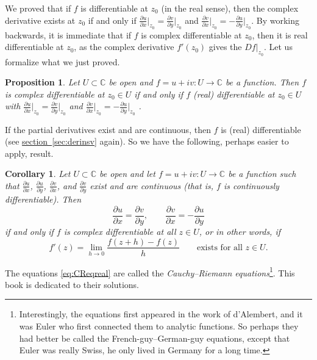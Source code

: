 \documentclass[12pt,openany]{book}
\newcommand{\C}{{\mathbb{C}}}
\newcommand{\myindex}[1]{#1\index{#1}}
\theoremstyle{plain}
\newtheorem{prop}[thm]{Proposition}
\newtheorem{cor}[thm]{Corollary}
\theoremstyle{remark}
\theoremstyle{definition}
\theoremstyle{exercise}
\theoremstyle{example}
\newcommand{\sectionref}[1]{\hyperref[#1]{section~\ref*{#1}}}
\begin{document}
We proved that if $f$ is differentiable at $z_0$ (in the real sense), then 
the complex derivative exists at $z_0$ if and only if 
$\frac{\partial u}{\partial x}\big|_{z_0} = \frac{\partial v}{\partial
y}\big|_{z_0}$ and $\frac{\partial v}{\partial x}\big|_{z_0} = -\frac{\partial
u}{\partial y}\big|_{z_0}$.
By working backwards, it is immediate
that if $f$ is complex differentiable at $z_0$, then it is real
differentiable at $z_0$,
as the complex derivative $f'(z_0)$ gives the $Df|_{z_0}$.  Let us formalize
what we just proved.

\begin{prop}
Let $U \subset \C$ be open and $f = u+iv \colon U \to \C$ be a function.
Then
$f$ is complex differentiable at $z_0 \in U$
if and only if
$f$ (real) differentiable at $z_0 \in U$
with
$\frac{\partial u}{\partial x}\big|_{z_0} =
\frac{\partial v}{\partial y}\big|_{z_0}$
and
$\frac{\partial v}{\partial x}\big|_{z_0} =
-\frac{\partial u}{\partial y}\big|_{z_0}$ .
\end{prop}

If the partial derivatives exist and are continuous, then $f$ is
(real) differentiable (see \sectionref{sec:derinsv} again).
So we have the following, perhaps easier to apply, result.

\begin{cor}
Let $U \subset \C$ be open and let $f = u+iv \colon U \to \C$ be a function
such that $\frac{\partial u}{\partial x}$, $\frac{\partial u}{\partial y}$, $\frac{\partial
v}{\partial x}$, and $\frac{\partial v}{\partial y}$ exist and are continuous (that is,
$f$ is continuously differentiable).
Then
\begin{equation} \label{eq:CReqreal}
\frac{\partial u}{\partial x} = \frac{\partial v}{\partial y} , \qquad
\frac{\partial v}{\partial x} = -\frac{\partial u}{\partial y}
\end{equation}
if and only if $f$ is complex differentiable at all $z \in U$, or in
other words, if
\begin{equation*}
f'(z) =
\lim_{h \to 0} \frac{f(z+h) - f(z)}{h}
\qquad
\text{exists for all $z \in U$.}
\end{equation*}
\end{cor}

The equations \eqref{eq:CReqreal} are called the
\emph{\myindex{Cauchy--Riemann equations}}\footnote{Interestingly,
the equations first appeared in the work of d'Alembert, and
it was Euler who first connected them to analytic functions.
So perhaps they had better be called the French-guy--German-guy equations,
except that Euler was really Swiss, he only lived in Germany for a long time.}.
This book is dedicated to their
solutions.
\end{document}

